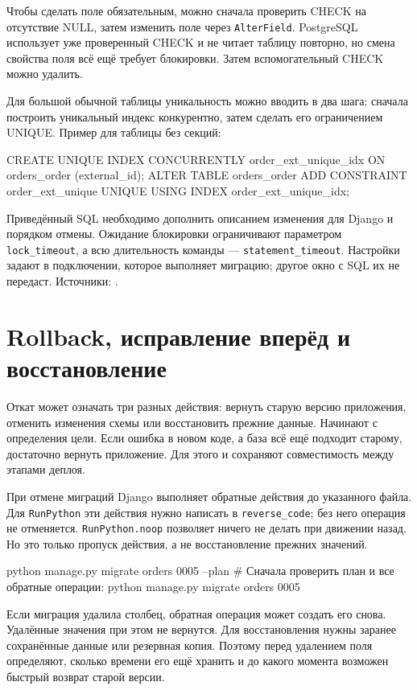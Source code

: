 \documentclass[11pt,a4paper]{article}
\newcommand{\src}[1]{{\small\color{muted}Источники: #1.}}
\newcommand{\parthead}[1]{\Needspace{10\baselineskip}\section{#1}}
\begin{document}
Чтобы сделать поле обязательным, можно сначала проверить CHECK на отсутствие NULL, затем изменить поле через \texttt{AlterField}. PostgreSQL использует уже проверенный CHECK и не читает таблицу повторно, но смена свойства поля всё ещё требует блокировки. Затем вспомогательный CHECK можно удалить.

Для большой обычной таблицы уникальность можно вводить в два шага: сначала построить уникальный индекс конкурентно, затем сделать его ограничением UNIQUE. Пример для таблицы без секций:
\begin{code}
CREATE UNIQUE INDEX CONCURRENTLY order_ext_unique_idx
    ON orders_order (external_id);
ALTER TABLE orders_order ADD CONSTRAINT order_ext_unique
    UNIQUE USING INDEX order_ext_unique_idx;
\end{code}
Приведённый SQL необходимо дополнить описанием изменения для Django и порядком отмены. Ожидание блокировки ограничивают параметром \texttt{lock\_timeout}, а всю длительность команды --- \texttt{statement\_timeout}. Настройки задают в подключении, которое выполняет миграцию; другое окно с SQL их не передаст.
\src{\cite{pgoperations,pgindex,pgalter,pglocks,pgtimeouts}}

\parthead{Rollback, исправление вперёд и восстановление}

Откат может означать три разных действия: вернуть старую версию приложения, отменить изменения схемы или восстановить прежние данные. Начинают с определения цели. Если ошибка в новом коде, а база всё ещё подходит старому, достаточно вернуть приложение. Для этого и сохраняют совместимость между этапами деплоя.

При отмене миграций Django выполняет обратные действия до указанного файла. Для \texttt{RunPython} эти действия нужно написать в \texttt{reverse\_code}; без него операция не отменяется. \texttt{RunPython.\allowbreak noop} позволяет ничего не делать при движении назад. Но это только пропуск действия, а не восстановление прежних значений.
\begin{code}
python manage.py migrate orders 0005 --plan
# Сначала проверить план и все обратные операции:
python manage.py migrate orders 0005
\end{code}
Если миграция удалила столбец, обратная операция может создать его снова. Удалённые значения при этом не вернутся. Для восстановления нужны заранее сохранённые данные или резервная копия. Поэтому перед удалением поля определяют, сколько времени его ещё хранить и до какого момента возможен быстрый возврат старой версии.
\end{document}
